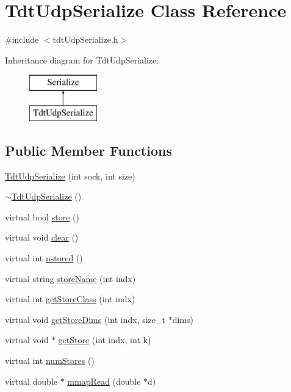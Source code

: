 \hypertarget{classTdtUdpSerialize}{\section{Tdt\-Udp\-Serialize Class Reference}
\label{classTdtUdpSerialize}
}


{\ttfamily \#include $<$tdt\-Udp\-Serialize.\-h$>$}

Inheritance diagram for Tdt\-Udp\-Serialize\-:\begin{figure}[H]
\begin{center}
\leavevmode
\includegraphics[height=2.000000cm]{classTdtUdpSerialize}
\end{center}
\end{figure}
\subsection*{Public Member Functions}
\begin{DoxyCompactItemize}
\item 
\hyperlink{classTdtUdpSerialize_a161b1f0f4e47f9d1e2cef6ebd14b0e95}{Tdt\-Udp\-Serialize} (int sock, int size)
\item 
\hyperlink{classTdtUdpSerialize_ae4b232bcd661aa79f445160acee8c631}{$\sim$\-Tdt\-Udp\-Serialize} ()
\item 
virtual bool \hyperlink{classTdtUdpSerialize_af90b9dd030658a60dd7221b68e47b0c1}{store} ()
\item 
virtual void \hyperlink{classTdtUdpSerialize_ac8510f3a23c5521f819c328d9e49bce7}{clear} ()
\item 
virtual int \hyperlink{classTdtUdpSerialize_a08a3fcd343162a03108e49e258a5faab}{nstored} ()
\item 
virtual string \hyperlink{classTdtUdpSerialize_aadd92c08f9323862f7f166a9e2cfaa83}{store\-Name} (int indx)
\item 
virtual int \hyperlink{classTdtUdpSerialize_a9dd4bd127aa84ce5aa4440a4e6f2f1ce}{get\-Store\-Class} (int indx)
\item 
virtual void \hyperlink{classTdtUdpSerialize_a1ef45e16bef8085e38796f0e94bc8333}{get\-Store\-Dims} (int indx, size\-\_\-t $\ast$dims)
\item 
virtual void $\ast$ \hyperlink{classTdtUdpSerialize_ae46b100495af52e51be07ed2df3e76d7}{get\-Store} (int indx, int k)
\item 
virtual int \hyperlink{classTdtUdpSerialize_a20d01c52f776c41002502949aae53896}{num\-Stores} ()
\item 
virtual double $\ast$ \hyperlink{classTdtUdpSerialize_ad22fb90570005daa6e8768c2f5dbb531}{mmap\-Read} (double $\ast$d)
\end{DoxyCompactItemize}
